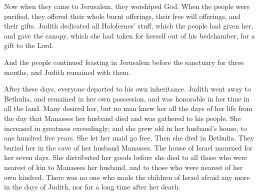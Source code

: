  Now when they came to Jerusalem, they worshiped God.
When the people were purified, they offered their whole burnt offerings,
their free will offerings, and their gifts.  Judith
dedicated all Holofernes' stuff, which the people had given her, and
gave the canopy, which she had taken for herself out of his bedchamber,
for a gift to the Lord.

 And the people continued feasting in Jerusalem before
the sanctuary for three months, and Judith remained with them.

 After these days, everyone departed to his own
inheritance. Judith went away to Bethulia, and remained in her own
possession, and was honorable in her time in all the land.
 Many desired her, but no man knew her all the days of
her life from the day that Manasses her husband died and was gathered to
his people.  She increased in greatness exceedingly; and
she grew old in her husband's house, to one hundred five years. She let
her maid go free. Then she died in Bethulia. They buried her in the cave
of her husband Manasses.  The house of Israel mourned for
her seven days. She distributed her goods before she died to all those
who were nearest of kin to Manasses her husband, and to those who were
nearest of her own kindred.  There was no one who made
the children of Israel afraid any more in the days of Judith, nor for a
long time after her death.
